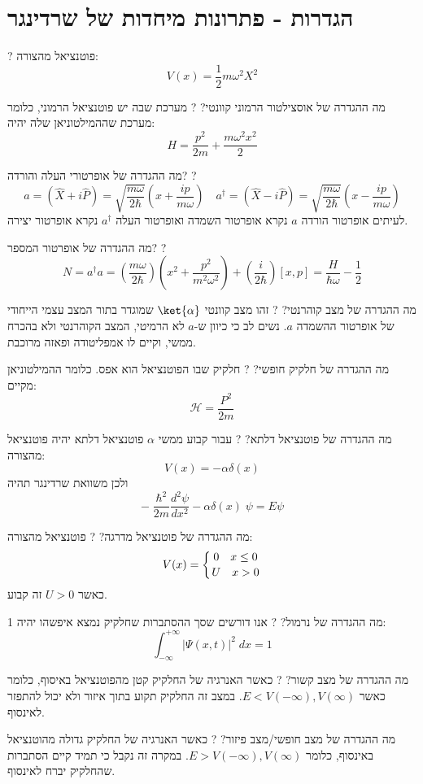 \documentclass{tstextbook}
\begin{document}
\section{הגדרות - פתרונות מיחדות של שרדינגר}

?
פוטנציאל מהצורה:
$$V(x)={\frac{1}{2}}m\omega^{2}X^{2}$$

מה ההגדרה של אוסצילטור הרמוני קוונטי?
?
מערכת שבה יש פוטנציאל הרמוני, כלומר מערכת שההמילטוניאן שלה יהיה:
$$H={\frac{p^{2}}{2m}}+{\frac{m\omega^{2}x^{2}}{2}}$$

מה ההגדרה של אופרטורי העלה והורדה?
?
$$a=\left( \hat{X}+i\hat{P} \right)=\sqrt{\frac{m\omega}{2\hbar}}\left(x+\frac{i p}{m\omega}\right)\quad a^{\dagger}=\left( \hat{X}-i\hat{P} \right)=\sqrt{\frac{m\omega}{2\hbar}}\left(x-\frac{i p}{m\omega}\right)$$
לעיתים אופרטור הורדה \(a\) נקרא אופרטור השמדה ואופרטור העלה \(a^{\dagger}\) נקרא אופרטור יצירה.

מה ההגדרה של אופרטור המספר?
?
$$N=a^{\dagger}a=\left(\frac{m\omega}{2\hbar}\right)\left(x^{2}+\frac{p^{2}}{m^{2}\omega^{2}}\right)+\left(\frac{i}{2\hbar}\right)[x,p]=\frac{H}{\hbar \omega}-\frac{1}{2}$$

מה ההגדרה של מצב קוהרנטי?
?
זהו מצב קוונטי \(\ket{\alpha}\) שמוגדר בתור המצב עצמי הייחודי של אופרטור ההשמדה \(a\). נשים לב כי כיוון ש-\(a\) לא הרמיטי, המצב הקוהרנטי ולא בהכרח ממשי, וקיים לו אמפליטודה ופאזה מרוכבת.

מה ההגדרה של חלקיק חופשי?
?
חלקיק שבו הפוטנציאל הוא אפס. כלומר ההמילטוניאן מקיים:
$$\mathcal{H}= \frac{P^{2}}{2m}$$

מה ההגדרה של פוטנציאל דלתא?
?
עבור קבוע ממשי \(\alpha\) פוטנציאל דלתא יהיה פוטנציאל מהצורה:
$$V(x)=-\alpha \delta(x)$$
ולכן משוואת שרדינגר תהיה
$$-\;\frac{\hbar^{2}}{2m}\frac{d^{2}\psi}{d x^{2}}-\alpha\delta(x)\;\psi=E\psi$$

מה ההגדרה של פוטנציאל מדרגה?
?
פוטנציאל מהצורה:
$$V(x)=\left\{{0\quad x\leq0}\atop{U\quad x>0}\right.$$
כאשר \(U>0\) זה קבוע.

מה ההגדרה של נרמול?
?
אנו דורשים שסך ההסתברות שחלקיק נמצא איפשהו יהיה 1:
$$\int_{-\infty}^{+\infty}|\Psi(x,t)|^{2}\;d x=1$$

מה ההגדרה של מצב קשור?
?
כאשר האנרגיה של החלקיק קטן מהפוטנציאל באיסוף, כלומר כאשר \(E<V\left( -\infty \right),V\left( \infty \right)\). במצב זה החלקיק תקוע בתוך איזור ולא יכול להתפזר לאינסוף.

מה ההגדרה של מצב חופשי/מצב פיזור?
?
כאשר האנרגיה של החלקיק גדולה מהוטנציאל באינסוף, כלומר \(E>V\left( -\infty \right),V\left( \infty \right)\). במקרה זה נקבל כי תמיד קיים הסתברות שהחלקיק יברח לאינסוף.
\end{document}
